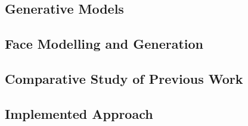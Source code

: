 \subsection{Generative Models}

\subsection{Face Modelling and Generation}

\subsection{Comparative Study of Previous Work}

\subsection{Implemented Approach}